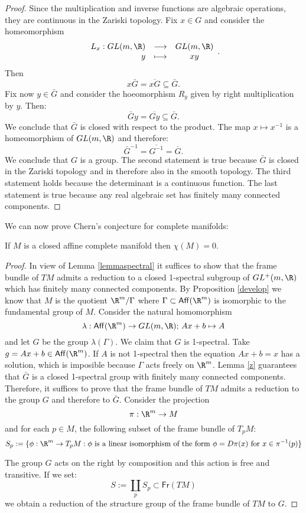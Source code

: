 \begin{proof}
	Since the multiplication and inverse functions are algebraic operations, they are continuous in the Zariski topology.
	Fix $x\in G$ and consider the homeomorphism 	
	\[\begin{array}{rcc}
	L_x: GL(m,\R) & \longrightarrow & GL(m,\R) \\
	y & \longmapsto & xy
	\end{array}.\\ \]
	Then \[x \bar{G}= \overline{x G}\subseteq \bar{G}.\]
	Fix now $y \in \bar{G}$ and consider the hoeomorphism $R_y$ given by right multiplication by $y$. Then:
	\[  \bar{G}y=\overline{ G y}\subseteq \bar{G}.\]
	We conclude that $\bar{G}$ is closed with respect to the product. The map $x \mapsto x^{-1}$ is a homeomorphism
	of $GL(m,\R)$ and therefore:
	\[ \bar{G}^{-1}=\overline{G^{-1}}=\overline{G}.\]
	We conclude that $G$ is a group.
	The second statement is true because $\bar{G}$ is closed in the Zariski topology and in therefore also in the smooth topology. The third statement holds because the determinant is a continuous function. The last statement is true because any real algebraic set has finitely many connected components. 	
	
\end{proof}

We can now prove Chern's conjecture for complete manifolds:
\begin{theorem}\label{Theocomplete}
	If $M$ is a closed affine complete manifold then $\chi(M)=0$.
\end{theorem}

\begin{proof}
	In view of Lemma \ref{lemmaspectral} it suffices to show that the frame bundle of $TM$ admits a reduction to
	a closed 1-spectral subgroup of $GL^+(m,\R)$ which has finitely many connected components. By Proposition \ref{develop} we know that $M$ is the quotient $ \R^m / \Gamma$ where $\Gamma \subset \mathsf{Aff}(\R^m)$ is isomorphic to the fundamental group of $M$. Consider the natural homomorphism
	\[ \lambda:  \mathsf{Aff}(\R^m) \rightarrow GL(m,\R); \, Ax+b \mapsto A \]
	and let $G$ be the group $\lambda(\Gamma)$. We claim that $G$ is 1-spectral. Take $g=Ax+b \in \mathsf{Aff}(\R^m)$. If $A$ is not 1-spectral then the equation $Ax+b=x$ has a solution, which is imposible because $\Gamma$ acts freely on $\R^m$.  Lemma \ref{z} guarantees that $\bar{G}$ is a closed 1-spectral group with finitely many connected components. Therefore, it suffices to prove that the frame bundle of $TM$ admits a reduction to the group $G$ and therefore to $\bar{G}$. Consider the projection \[ \pi: \R^m \rightarrow M\] and for each $p\in M$, the following subset of the frame bundle of $T_pM$:
	\[ S_p:=\{ \phi: \R^m \rightarrow T_pM: \phi \text{ is a linear isomorphism of the form } \phi= D\pi(x) \text{ for } x \in \pi^{-1}(p)\} \]
	
	The group $G$ acts on the right by composition and this action is free and transitive. If we set:
	\[S:=\coprod_p S_p\subset \mathsf{Fr}(TM)\]
	we obtain a reduction of the structure group of the frame bundle of $TM$ to $G$.
\end{proof}
